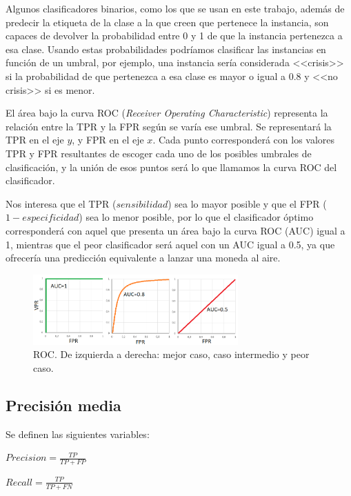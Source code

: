 Algunos clasificadores binarios, como los que se usan en este trabajo, además de predecir la etiqueta de la clase a la que creen que pertenece la instancia, son capaces de devolver la probabilidad entre 0 y 1 de que la instancia pertenezca a esa clase. Usando estas probabilidades podríamos clasificar las instancias en función de un umbral, por ejemplo, una instancia sería considerada <<crisis>> si la probabilidad de que pertenezca a esa clase es mayor o igual a 0.8 y <<no crisis>> si es menor. 

El área bajo la curva ROC (\textit{Receiver Operating Characteristic}) representa la relación entre la TPR y la FPR según se varía ese umbral. Se representará la TPR en el eje $y$, y FPR en el eje $x$. Cada punto corresponderá con los valores TPR y FPR resultantes de escoger cada uno de los posibles umbrales de clasificación, y la unión de esos puntos será lo que llamamos la curva ROC del clasificador.

Nos interesa que el TPR ($sensibilidad$) sea lo mayor posible y que el FPR ($1-especificidad$) sea lo menor posible, por lo que el clasificador óptimo corresponderá con aquel que presenta un área bajo la curva ROC (AUC) igual a 1, mientras que el peor clasificador será aquel con un AUC igual a 0.5, ya que ofrecería una predicción equivalente a lanzar una moneda al aire. 

\begin{figure}[H]
	\centering
	\includegraphics[width=0.7\textwidth]{../img/roc.png}
	\caption{ROC. De izquierda a derecha: mejor caso, caso intermedio y peor caso.}
	\label{fig:roc}
\end{figure} 

\subsection{Precisión media}

Se definen las siguientes variables: 
\begin{center}
	$Precision=\frac{TP}{TP+FP}$
\end{center}
\begin{center}
	$Recall=\frac{TP}{TP+FN}$
\end{center}

